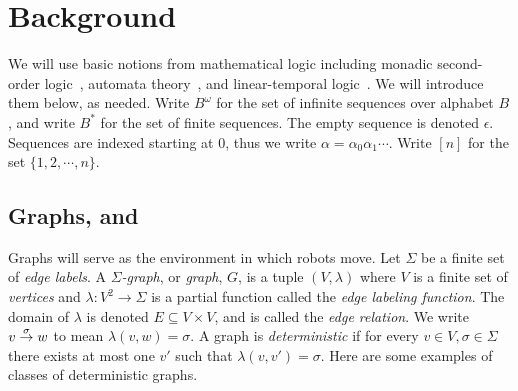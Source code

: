 \section{Background}  \label{sec:prelim}
We will use basic notions from mathematical logic including monadic second-order logic~\cite{EbFl95}, automata theory~\cite{HMU03}, 
and linear-temporal logic~\cite{CGP1999}. We will introduce them below, as needed.
%
Write $B^\omega$ for the set of infinite sequences over alphabet $B$, and write $B^*$ for the set of finite sequences. The empty sequence is denoted $\epsilon$.
Sequences are indexed starting at $0$, thus we write $\alpha = \alpha_0 \alpha_1  \cdots$. 
Write $[n]$ for the set $\{1,2,\cdots,n\}$.


\subsection{Graphs, \LTL and \msol} \label{subsec:graphs-MSOL}

 Graphs will serve as the environment in which robots move.
Let $\Sigma$ be a finite set of {\em edge labels}.
A {\em $\Sigma$-graph}, or {\em graph}, $G$, is a tuple $(V,\lambda)$ where $V$ is a finite set of {\em vertices} and $\lambda:V^2 \to \Sigma$ is a partial function called the {\em edge labeling function}. The domain of $\lambda$ is denoted $E \subseteq V \times V$, and is called the
{\em edge relation}. We write $v \stackrel{{\sigma}}{\rightarrow} w$ to mean $\lambda(v,w) = \sigma$.
A graph is \emph{deterministic} if for every $v \in V, \sigma \in \Sigma$ there exists at most one $v'$ such that $\lambda(v,v') = \sigma$. Here are some examples of classes of deterministic graphs.


%
%
%


